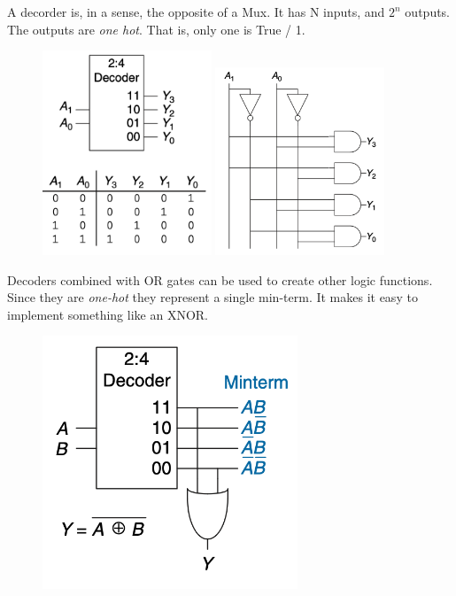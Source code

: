 \documentclass[12pt]{report}
\begin{document}
A decorder is, in a sense, the opposite of a Mux. It has N inputs, and $2^n$ outputs. The outputs are \textit{one hot}. That is, only one is 
True / 1. 

\begin{figure}[h!]
  \centering
  \includegraphics[width=0.45\textwidth]{2:4-decoder.png} %
  \hspace{0.05\textwidth} %
  \includegraphics[width=0.45\textwidth]{decoder-imp.png} %
\end{figure}

\noindent Decoders combined with OR gates can be used to create other logic functions. Since they are \textit{one-hot} they represent a single min-term. 
It makes it easy to implement something like an XNOR.  

\begin{figure}[h!]
  \centering
  \includegraphics[width=3in]{XNOR-decoder.png}
\end{figure}
\end{document}
